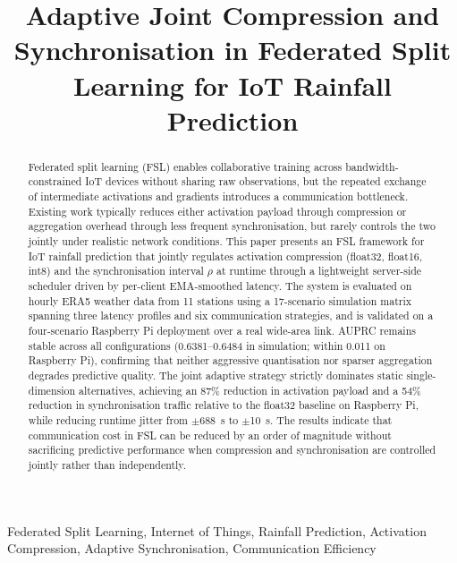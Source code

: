 \documentclass[conference]{IEEEtran}
\title{Adaptive Joint Compression and Synchronisation in Federated Split Learning for IoT Rainfall Prediction}
\begin{document}
\maketitle

\begin{abstract}
Federated split learning (FSL) enables collaborative training across bandwidth-constrained IoT devices without sharing raw observations, but the repeated exchange of intermediate activations and gradients introduces a communication bottleneck. Existing work typically reduces either activation payload through compression or aggregation overhead through less frequent synchronisation, but rarely controls the two jointly under realistic network conditions. This paper presents an FSL framework for IoT rainfall prediction that jointly regulates activation compression (float32, float16, int8) and the synchronisation interval $\rho$ at runtime through a lightweight server-side scheduler driven by per-client EMA-smoothed latency. The system is evaluated on hourly ERA5 weather data from 11 stations using a 17-scenario simulation matrix spanning three latency profiles and six communication strategies, and is validated on a four-scenario Raspberry Pi deployment over a real wide-area link. AUPRC remains stable across all configurations (0.6381--0.6484 in simulation; within 0.011 on Raspberry Pi), confirming that neither aggressive quantisation nor sparser aggregation degrades predictive quality. The joint adaptive strategy strictly dominates static single-dimension alternatives, achieving an 87\% reduction in activation payload and a 54\% reduction in synchronisation traffic relative to the float32 baseline on Raspberry Pi, while reducing runtime jitter from $\pm$688~s to $\pm$10~s. The results indicate that communication cost in FSL can be reduced by an order of magnitude without sacrificing predictive performance when compression and synchronisation are controlled jointly rather than independently.
\end{abstract}

\begin{IEEEkeywords}
Federated Split Learning, Internet of Things, Rainfall Prediction, Activation Compression, Adaptive Synchronisation, Communication Efficiency
\end{IEEEkeywords}

\end{document}

